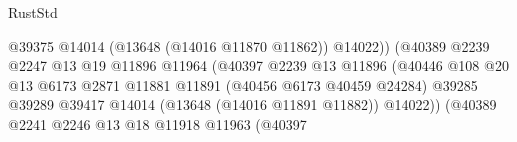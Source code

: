 \begin{lexlean}{RustStd}
\begin{coremodule}
                                                            @39375
                                                            @14014
                                                            (@13648 (@14016 @11870 @11862))
                                                            @14022))
                                                        (@40389
                                                          @2239
                                                          @2247
                                                          @13
                                                          @19
                                                          @11896
                                                          @11964
                                                          (@40397
                                                            @2239
                                                            @13
                                                            @11896
                                                            (@40446
                                                              @108
                                                              @20
                                                              @13
                                                              @6173
                                                              @2871
                                                              @11881
                                                              @11891
                                                              (@40456 @6173 @40459 @24284)
                                                              @39285
                                                              @39289
                                                              @39417
                                                              @14014
                                                              (@13648 (@14016 @11891 @11882))
                                                              @14022))
                                                          (@40389
                                                            @2241
                                                            @2246
                                                            @13
                                                            @18
                                                            @11918
                                                            @11963
                                                            (@40397

\end{coremodule}
\end{lexlean}
